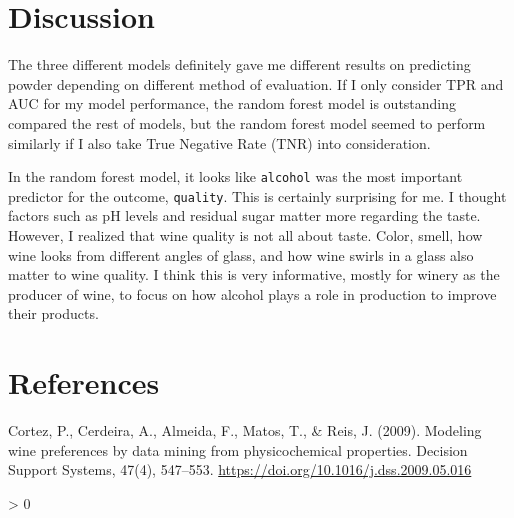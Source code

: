 \documentclass[
  english,
  man]{apa6}
\newlength{\cslhangindent}
\newenvironment{CSLReferences}[2] %
 {%
  \setlength{\parindent}{0pt}
  \ifodd #1 \everypar{\setlength{\hangindent}{\cslhangindent}}\ignorespaces\fi
  \ifnum #2 > 0
  \setlength{\parskip}{#2\baselineskip}
  \fi
 }%
 {}
\begin{document}
\hypertarget{discussion}{%
\section{Discussion}\label{discussion}}

The three different models definitely gave me different results on predicting powder depending on different method of evaluation. If I only consider TPR and AUC for my model performance, the random forest model is outstanding compared the rest of models, but the random forest model seemed to perform similarly if I also take True Negative Rate (TNR) into consideration.

In the random forest model, it looks like \texttt{alcohol} was the most important predictor for the outcome, \texttt{quality}. This is certainly surprising for me. I thought factors such as pH levels and residual sugar matter more regarding the taste. However, I realized that wine quality is not all about taste. Color, smell, how wine looks from different angles of glass, and how wine swirls in a glass also matter to wine quality. I think this is very informative, mostly for winery as the producer of wine, to focus on how alcohol plays a role in production to improve their products.

\newpage

\hypertarget{references}{%
\section{References}\label{references}}

\begingroup
\setlength{\parindent}{-0.5in}
\setlength{\leftskip}{0.5in}

Cortez, P., Cerdeira, A., Almeida, F., Matos, T., \& Reis, J. (2009). Modeling wine preferences by data mining from physicochemical properties. Decision Support Systems, 47(4), 547--553. \url{https://doi.org/10.1016/j.dss.2009.05.016}

\hypertarget{refs}{}
\begin{CSLReferences}{0}{0}
\end{CSLReferences}

\endgroup
\end{document}
